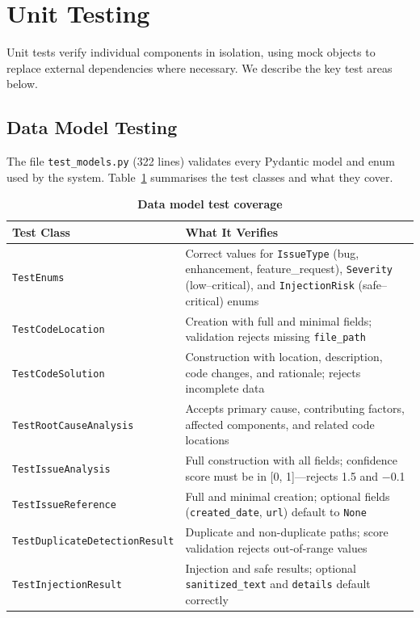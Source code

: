 \section{Unit Testing}

Unit tests verify individual components in isolation, using mock objects to replace external dependencies where necessary. We describe the key test areas below.

\subsection{Data Model Testing}

The file \texttt{test\_models.py} (322 lines) validates every Pydantic model and enum used by the system. Table~\ref{tab:modeltests} summarises the test classes and what they cover.

\begin{table}[htb]
\centering
\renewcommand{\arraystretch}{1.3}
\setlength{\arrayrulewidth}{0.5mm}
\fontsize{10}{12}\selectfont
\caption[Data model test coverage]{\textbf{Data model test coverage}}
\vspace{2mm}
\label{tab:modeltests}
\begin{tabular}{|p{4cm}|p{8cm}|}
\hline
\textbf{Test Class} & \textbf{What It Verifies} \\
\hline
\texttt{TestEnums} & Correct values for \texttt{IssueType} (bug, enhancement, feature\_request), \texttt{Severity} (low--critical), and \texttt{InjectionRisk} (safe--critical) enums \\
\hline
\texttt{TestCodeLocation} & Creation with full and minimal fields; validation rejects missing \texttt{file\_path} \\
\hline
\texttt{TestCodeSolution} & Construction with location, description, code changes, and rationale; rejects incomplete data \\
\hline
\texttt{TestRootCauseAnalysis} & Accepts primary cause, contributing factors, affected components, and related code locations \\
\hline
\texttt{TestIssueAnalysis} & Full construction with all fields; confidence score must be in [0, 1]---rejects 1.5 and $-$0.1 \\
\hline
\texttt{TestIssueReference} & Full and minimal creation; optional fields (\texttt{created\_date}, \texttt{url}) default to \texttt{None} \\
\hline
\texttt{TestDuplicateDetectionResult} & Duplicate and non-duplicate paths; score validation rejects out-of-range values \\
\hline
\texttt{TestInjectionResult} & Injection and safe results; optional \texttt{sanitized\_text} and \texttt{details} default correctly \\
\hline
\end{tabular}
\end{table}

